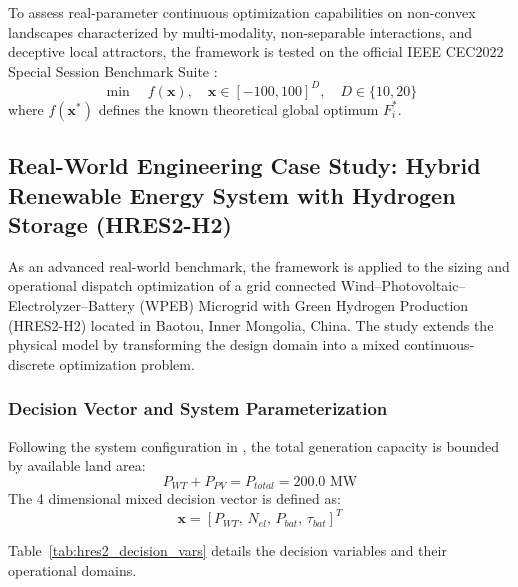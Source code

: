 To assess real-parameter continuous optimization capabilities on non-convex landscapes characterized by multi-modality, non-separable interactions, and deceptive local attractors, the framework is tested on the official IEEE CEC2022 Special Session Benchmark Suite \cite{jiang_cec_suite}:
\begin{equation}
\min \quad f(\mathbf{x}), \quad \mathbf{x} \in [-100, 100]^D, \quad D \in \{10, 20\}
\label{eq:cec_objective}
\end{equation}
where $f(\mathbf{x}^*)$ defines the known theoretical global optimum $F_i^*$.



\subsection{Real-World Engineering Case Study: Hybrid Renewable Energy System with Hydrogen Storage (HRES2-H2)}
\label{sec:hres2_case_study}

As an advanced real-world benchmark, the framework is applied to the sizing and operational dispatch optimization of a grid connected Wind--Photovoltaic--Electrolyzer--Battery (WPEB) Microgrid with Green Hydrogen Production (HRES2-H2) located in Baotou, Inner Mongolia, China. The study extends the physical model \cite{li2024capacity}  by transforming the design domain into a mixed continuous-discrete optimization problem.

\subsubsection{Decision Vector and System Parameterization}

Following the system configuration in \cite{li2024capacity}, the total generation capacity is bounded by available land area:
\begin{equation}
P_{WT} + P_{PV} = P_{total} = 200.0 \text{ MW}
\label{eq:generation_constraint}
\end{equation}
The 4 dimensional mixed decision vector is defined as:
\begin{equation}
\mathbf{x} = \left[ P_{WT},\, N_{el},\, P_{bat},\, \tau_{bat} \right]^T
\label{eq:hres2_decision_vector}
\end{equation} 

Table~\ref{tab:hres2_decision_vars} details the decision variables and their operational domains.


